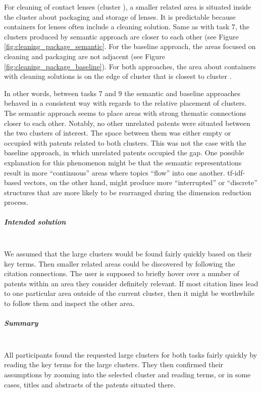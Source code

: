 For cleaning of contact lenses (cluster ), a smaller related area is situated inside the cluster  about packaging and storage of lenses.
It is predictable because containers for lenses often include a cleaning solution.
Same as with task 7, the clusters produced by semantic approach are closer to each other (see Figure \autoref{fig:cleaning_package_semantic}.
For the baseline approach, the areas focused on cleaning and packaging are not adjacent (see Figure \autoref{fig:cleaning_package_baseline}).
For both approaches, the area about containers with cleaning solutions is on the edge of cluster  that is closest to cluster .

In other words,  between tasks 7 and 9 the semantic and baseline approaches behaved in a consistent way with regards to the relative placement of clusters.
The semantic approach seems to place areas with strong thematic connections closer to each other.
Notably, no other unrelated patents were situated between the two clusters of interest.
The space between them was either empty or occupied with patents related to both clusters.
This was not the case with the baseline approach, in which unrelated patents occupied the gap.
One possible explanation for this phenomenon might be that the semantic representations result in more ``continuous'' areas where topics ``flow'' into one another.
\gls{tf-idf}-based vectors, on the other hand, might produce more ``interrupted'' or ``discrete'' structures that are more likely to be rearranged during the dimension reduction process.

\subparagraph{Intended solution}~\\
We assumed that the large clusters would be found fairly quickly based on their key terms. 
Then smaller related areas could be discovered by following the citation connections.
The user is supposed to briefly hover over a number of patents within an area they consider definitely relevant.
If most citation lines lead to one particular area outside of the current cluster, then it might be worthwhile to follow them and inspect the other area.

\subparagraph{Summary}~\\
All participants found the requested large clusters for both tasks fairly quickly by reading the key terms for the large clusters.
They then confirmed their assumptions by zooming into the selected cluster and reading terms, or in some cases, titles and abstracts of the patents situated there.

